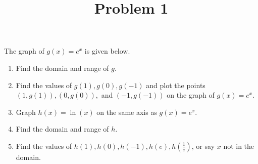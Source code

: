 \documentclass{ximera}
\title[Problem 1]{Problem 1}
\begin{document}
\begin{abstract} \end{abstract}
\maketitle

\begin{problem}
The graph of $g(x)=e^x$ is given below.

	  \begin{center}
	\end{center}

\begin{enumerate}	
	\item  Find the domain and range of $g$.
\item  Find the values of $g(1), g(0), g(-1)$ and plot the points $(1,g(1)), (0,g(0)),$ and $(-1,g(-1))$  on the graph of $g(x)=e^x$.
\item Graph $h(x)=\ln(x)$ on the same axis as $g(x)=e^x$.
\item Find the domain and range of $h$.
\item Find the values of $h(1), h(0), h(-1), h(e), h\left(\frac{1}{e}\right)$, or say $x$ not in the domain.
\end{enumerate}

\end{problem}
\end{document}
